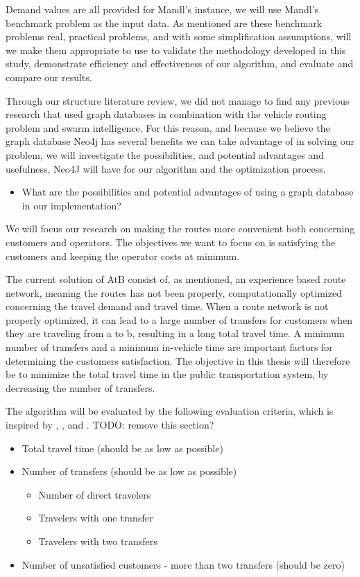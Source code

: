 Demand values are all provided for Mandl's instance, we will use Mandl's benchmark problem \citep{mandl79} as the input data. 
As mentioned are these benchmark problems real, practical problems, and with some simplification assumptions, will we make them appropriate to use to validate the methodology developed in this study, demonstrate efficiency and effectiveness of our algorithm, and evaluate and compare our results. 

Through our structure literature review, we did not manage to find any previous research that used graph databases in combination with the vehicle routing problem and swarm intelligence. For this reason, and because we believe the graph database Neo4j \citep{website:neo4j} has several benefits we can take advantage of in solving our problem, we will investigate the possibilities, and potential advantages and usefulness, Neo4J will have for our algorithm and the optimization process.
\begin{itemize}
\item What are the possibilities and potential advantages of using a graph database in our implementation?
\end{itemize}

We will focus our research on making the routes more convenient both concerning customers and operators. The objectives we want to focus on is satisfying the customers and keeping the operator costs at minimum. 

The current solution of AtB \citep{website:atb} consist of, as mentioned, an experience based route network, meaning the routes has not been properly, computationally optimized concerning the travel demand and travel time. When a route network is not properly optimized, it can lead to a large number of transfers for customers when they are traveling from a to b, resulting in a long total travel time. A minimum number of transfers and a minimum in-vehicle time are important factors for determining the customers satisfaction. The objective in this thesis will therefore be to minimize the total travel time in the public transportation system, by decreasing the number of transfers. %

The algorithm will be evaluated by the following evaluation criteria, which is inspired by \citep{kechagiopoulos14}, \citep{mandl80}, \citep{nikolic14} and \citep{fan09}. TODO: remove this section?
\begin{itemize}
\item Total travel time (should be as low as possible)
\item Number of transfers (should be as low as possible)
\begin{itemize}
\item Number of direct travelers 
\item Travelers with one transfer
\item Travelers with two transfers
\end{itemize}
\item Number of unsatisfied customers - more than two transfers (should be zero)
\end{itemize}

